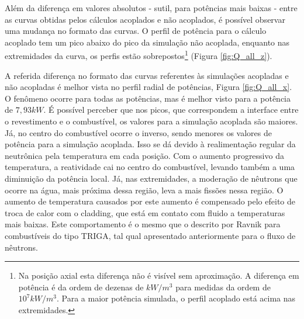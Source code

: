 Além da diferença em valores absolutos - sutil, para potências mais baixas - entre as curvas obtidas pelos
cálculos acoplados e não acoplados, é possível observar uma mudança no formato das curvas. O perfil de
potência para o cálculo acoplado tem um pico abaixo do pico da simulação
não acoplada, enquanto nas extremidades da curva, os perfis estão sobrepostos\footnote{Na posição
  axial esta diferença não é visível sem aproximação. A diferença em potência é da ordem de dezenas de $kW/m^3$ para medidas da
  ordem de $10^7 kW/m^3$. Para a maior potência simulada, o perfil acoplado está acima nas extremidades.} (Figura \ref{fig:Q_all_z}).

A referida diferença no formato das curvas referentes às simulações acopladas e não acopladas é melhor vista no
perfil radial de potências, Figura \ref{fig:Q_all_x}. O fenômeno ocorre para todas as potências, mas é melhor
visto para a potência de $7,93 kW$. É possível perceber que nos picos, que correspondem a interface entre o
revestimento e o combustível, os valores para a simulação acoplada são maiores. Já, no centro do combustível
ocorre o inverso, sendo menores os valores de potência para a simulação acoplada. Isso se dá devido à realimentação
regular da neutrônica pela temperatura em cada posição. Com o aumento progressivo da temperatura, a reatividade
cai no centro do combustível, levando também a uma diminuição da potência local. Já, nas extremidades, a moderação
de nêutrons que ocorre na água, mais próxima dessa região, leva a mais fissões nessa região. O aumento de temperatura
causados por este aumento é compensado pelo efeito de troca de calor com o cladding, que está em contato com fluido
a temperaturas mais baixas. Este comportamento é o mesmo que o descrito por Ravnik \cite{Ravnik1990}
para combustíveis do tipo TRIGA, tal qual apresentado anteriormente para o fluxo de nêutrons.

